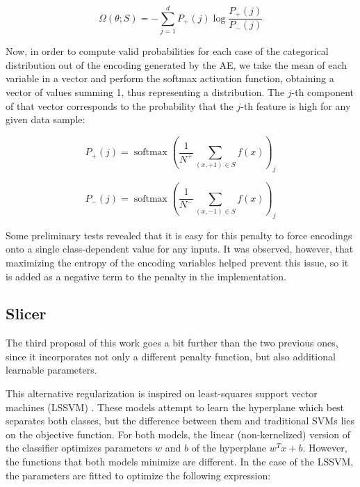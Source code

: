 \begin{equation} \Omega(\theta;S)=- \sum_{j=1}^{d}P_+(j) \log\frac{P_+(j)}{P_-(j)}\end{equation}


Now, in order to compute valid probabilities for each case of the categorical distribution out of the encoding generated by the AE, we take the mean of each variable in a vector and perform the softmax activation function, obtaining a vector of values summing 1, thus representing a distribution. The $j$-th component of that vector corresponds to the probability that the $j$-th feature is high for any given data sample:

\begin{equation} P_+(j)=\operatorname{softmax}\left(\frac{1}{N^{+}}\sum_{(x,+1)\in S}f(x)\right)_j \end{equation}

\begin{equation} P_-(j)=\operatorname{softmax}\left(\frac{1}{N^{-}}\sum_{(x,-1)\in S}f(x)\right)_j \end{equation}

Some preliminary tests revealed that it is easy for this penalty to force encodings onto a single class-dependent value for any inputs. It was observed, however, that maximizing the entropy of the encoding variables helped prevent this issue, so it is added as a negative term to the penalty in the implementation.

\subsection{Slicer}

The third proposal of this work goes a bit further than the two previous ones, since it incorporates not only a different penalty function, but also additional learnable parameters.

This alternative regularization is inspired on least-squares support vector machines (LSSVM) . These models attempt to learn the hyperplane which best separates both classes, but the difference between them and traditional SVMs lies on the objective function. For both models, the linear (non-kernelized) version of the classifier optimizes parameters $w$ and $b$ of the hyperplane $w^Tx+b$. However, the functions that both models minimize are different. In the case of the LSSVM, the parameters are fitted to optimize the following expression:

